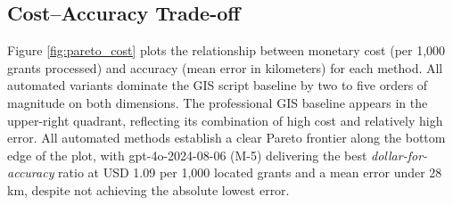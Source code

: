 \subsection{Cost--Accuracy Trade-off}\label{costaccuracy-trade-off}

Figure \ref{fig:pareto_cost} plots the relationship between monetary
cost (per 1,000 grants processed) and accuracy (mean error in
kilometers) for each method\DIFaddbegin {}\DIFaddend . All automated variants dominate the GIS script baseline
by two to five orders of magnitude on both dimensions. The professional
GIS baseline appears in the upper-right quadrant, reflecting its
combination of high cost and relatively high error. All automated
methods establish a clear Pareto frontier along the bottom edge of the
plot, with gpt-4o-2024-08-06 (M-5) delivering the best
\emph{dollar-for-accuracy} ratio at USD 1.09 per 1,000 located grants
and a mean error under 28 km, despite not achieving the absolute lowest
error.

